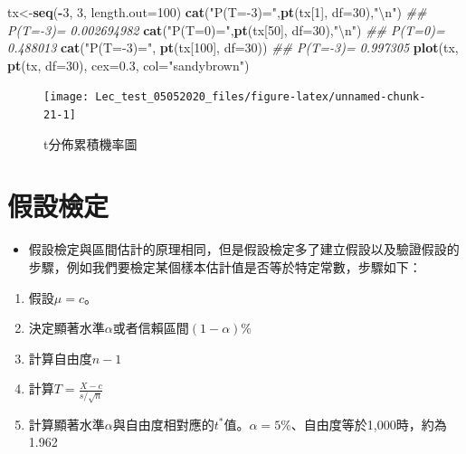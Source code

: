 \documentclass[hyperref,]{ctexart}
\newenvironment{Shaded}{\begin{snugshade}}{\end{snugshade}}
\newcommand{\CharTok}[1]{\textcolor[rgb]{0.31,0.60,0.02}{#1}}
\newcommand{\CommentTok}[1]{\textcolor[rgb]{0.56,0.35,0.01}{\textit{#1}}}
\newcommand{\DataTypeTok}[1]{\textcolor[rgb]{0.13,0.29,0.53}{#1}}
\newcommand{\DecValTok}[1]{\textcolor[rgb]{0.00,0.00,0.81}{#1}}
\newcommand{\FloatTok}[1]{\textcolor[rgb]{0.00,0.00,0.81}{#1}}
\newcommand{\KeywordTok}[1]{\textcolor[rgb]{0.13,0.29,0.53}{\textbf{#1}}}
\newcommand{\NormalTok}[1]{#1}
\newcommand{\OperatorTok}[1]{\textcolor[rgb]{0.81,0.36,0.00}{\textbf{#1}}}
\newcommand{\StringTok}[1]{\textcolor[rgb]{0.31,0.60,0.02}{#1}}
\providecommand{\tightlist}{%
  \setlength{\itemsep}{0pt}\setlength{\parskip}{0pt}}
\begin{document}
\begin{Shaded}
\begin{Highlighting}[]
\NormalTok{tx<-}\KeywordTok{seq}\NormalTok{(}\OperatorTok{-}\DecValTok{3}\NormalTok{, }\DecValTok{3}\NormalTok{, }\DataTypeTok{length.out=}\DecValTok{100}\NormalTok{)}
\KeywordTok{cat}\NormalTok{(}\StringTok{"P(T=-3)="}\NormalTok{,}\KeywordTok{pt}\NormalTok{(tx[}\DecValTok{1}\NormalTok{], }\DataTypeTok{df=}\DecValTok{30}\NormalTok{),}\StringTok{"}\CharTok{\textbackslash{}n}\StringTok{"}\NormalTok{)}
\CommentTok{## P(T=-3)= 0.002694982}
\KeywordTok{cat}\NormalTok{(}\StringTok{"P(T=0)="}\NormalTok{,}\KeywordTok{pt}\NormalTok{(tx[}\DecValTok{50}\NormalTok{], }\DataTypeTok{df=}\DecValTok{30}\NormalTok{),}\StringTok{"}\CharTok{\textbackslash{}n}\StringTok{"}\NormalTok{)}
\CommentTok{## P(T=0)= 0.488013}
\KeywordTok{cat}\NormalTok{(}\StringTok{"P(T=-3)="}\NormalTok{, }\KeywordTok{pt}\NormalTok{(tx[}\DecValTok{100}\NormalTok{], }\DataTypeTok{df=}\DecValTok{30}\NormalTok{))}
\CommentTok{## P(T=-3)= 0.997305}
\KeywordTok{plot}\NormalTok{(tx, }\KeywordTok{pt}\NormalTok{(tx, }\DataTypeTok{df=}\DecValTok{30}\NormalTok{), }\DataTypeTok{cex=}\FloatTok{0.3}\NormalTok{, }\DataTypeTok{col=}\StringTok{"sandybrown"}\NormalTok{)}
\end{Highlighting}
\end{Shaded}

\begin{figure}

\texttt{[image: Lec\_test\_05052020\_files/figure-latex/unnamed-chunk-21-1]} \hfill{}

\caption{\label{fig:cumu1}t分佈累積機率圖}\label{fig:unnamed-chunk-21}
\end{figure}

\hypertarget{ux5047ux8a2dux6aa2ux5b9a}{%
\section{假設檢定}\label{ux5047ux8a2dux6aa2ux5b9a}}

\begin{itemize}
\tightlist
\item
  假設檢定與區間估計的原理相同，但是假設檢定多了建立假設以及驗證假設的步驟，例如我們要檢定某個樣本估計值是否等於特定常數，步驟如下：
\end{itemize}

\begin{enumerate}
\def\labelenumi{\arabic{enumi}.}
\item
  假設\(\mu=c\)。
\item
  決定顯著水準\(\alpha\)或者信賴區間\((1-\alpha)\%\)
\item
  計算自由度\(n-1\)
\item
  計算\(T=\frac{X-c}{s/\sqrt{n}}\)
\item
  計算顯著水準\(\alpha\)與自由度相對應的\(t^{*}\)值。\(\alpha=5\%\)、自由度等於1,000時，約為1.962
\end{enumerate}
\end{document}
